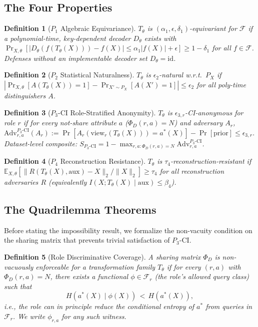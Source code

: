 \documentclass{article}
\newtheorem{definition}{Definition}
\theoremstyle{remark}
\newcommand{\E}{\mathbb{E}}
\newcommand{\Adv}{\mathrm{Adv}}
\newcommand{\view}{\mathrm{view}}
\newcommand{\PCI}{P_3\text{-CI}}
\newcommand{\SCI}{S_{P_3\text{-CI}}}
\begin{document}
\subsection{The Four Properties}

\begin{definition}[$P_1$ Algebraic Equivariance]
$T_\theta$ is $(\alpha_1, \epsilon, \delta_1)$-equivariant for $\mathcal{F}$ if a polynomial-time, key-dependent decoder $D_\theta$ exists with $\Pr_{X,\theta}[|D_\theta(f(T_\theta(X))) - f(X)| \le \alpha_1 |f(X)| + \epsilon] \ge 1 - \delta_1$ for all $f \in \mathcal{F}$. Defenses without an implementable decoder set $D_\theta = \mathrm{id}$.
\end{definition}

\begin{definition}[$P_2$ Statistical Naturalness]
$T_\theta$ is $\epsilon_2$-natural w.r.t.\ $P_X$ if $|\Pr_{X,\theta}[A(T_\theta(X))=1] - \Pr_{X' \sim P_X}[A(X')=1]| \le \epsilon_2$ for all poly-time distinguishers $A$.
\end{definition}

\begin{definition}[$\PCI$ Role-Stratified Anonymity]
$T_\theta$ is $\epsilon_{3,r}$-CI-anonymous for role $r$ if for every not-share attribute $a$ ($\Phi_D(r,a) = N$) and adversary $A_r$, $\Adv^{\PCI}_{r,a}(A_r) := \Pr[A_r(\view_r(T_\theta(X))) = a^*(X)] - \Pr[\text{prior}] \le \epsilon_{3,r}$. Dataset-level composite: $\SCI = 1 - \max_{r,a: \Phi_D(r,a)=N} \Adv^{\PCI}_{r,a}$.
\end{definition}

\begin{definition}[$P_4$ Reconstruction Resistance]
$T_\theta$ is $\tau_4$-reconstruction-resistant if $\E_{X,\theta}[\|R(T_\theta(X), \mathrm{aux}) - X\|_2 / \|X\|_2] \ge \tau_4$ for all reconstruction adversaries $R$ (equivalently $I(X; T_\theta(X) \mid \mathrm{aux}) \le \beta_4$).
\end{definition}

\subsection{The Quadrilemma Theorems}

Before stating the impossibility result, we formalize the non-vacuity condition on the sharing matrix that prevents trivial satisfaction of $\PCI$.

\begin{definition}[Role Discriminative Coverage]
\label{def:rdc}
A sharing matrix $\Phi_D$ is \emph{non-vacuously enforceable} for a transformation family $T_\theta$ if for every $(r, a)$ with $\Phi_D(r, a) = N$, there exists a functional $\phi \in \mathcal{F}_r$ (the role's allowed query class) such that
\[
H(a^*(X) \mid \phi(X)) \,<\, H(a^*(X)),
\]
i.e., the role can in principle reduce the conditional entropy of $a^*$ from queries in $\mathcal{F}_r$. We write $\phi_{r,a}$ for any such witness.
\end{definition}
\end{document}
